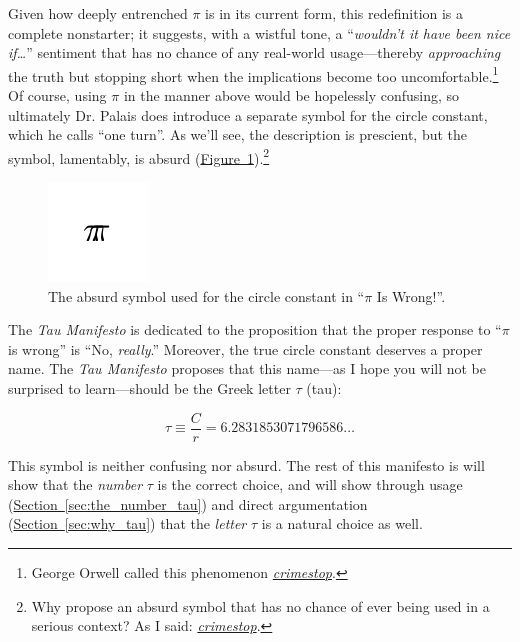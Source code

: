 \documentclass{article}
\begin{document}
\noindent Given how deeply entrenched $\pi$ is in its current form, this redefinition is a complete nonstarter; it suggests, with a wistful tone, a ``\emph{wouldn't it have been nice if\ldots}'' sentiment that has no chance of any real-world usage---thereby \emph{approaching} the truth but stopping short when the implications become too uncomfortable.\footnote{George Orwell called this phenomenon \href{http://en.wikipedia.org/wiki/Crimestop}{\emph{crimestop}}.} Of course, using $\pi$ in the manner above would be hopelessly confusing, so ultimately Dr. Palais does introduce a separate symbol for the circle constant, which he calls ``one turn''.  As we'll see, the description is prescient, but the symbol, lamentably, is absurd (\hyperref[fig:palais-tau]{Figure~}\ref{fig:palais-tau}).\footnote{Why propose an absurd symbol that has no chance of ever being used in a serious context? As I said: \href{http://en.wikipedia.org/wiki/Crimestop}{\emph{crimestop}}.}


\begin{figure}
\begin{center}
\includegraphics{images/figures/palais-tau.png}
\end{center}
\caption{The absurd symbol used for the circle constant in ``$\pi$ Is Wrong!''.\label{fig:palais-tau}}
\end{figure}

The \emph{Tau Manifesto} is dedicated to the proposition that the proper response to ``$\pi$ is wrong'' is ``No, \emph{really}.'' Moreover, the true circle constant deserves a proper name. The \emph{Tau Manifesto} proposes that this name---as I hope you will not be surprised to learn---should be the Greek letter $\tau$ (tau):

\[
  \tau \equiv \frac{C}{r} = 6.2831853071796586\ldots
\]

\noindent This symbol is neither confusing nor absurd. The rest of this manifesto is will show that the \emph{number} $\tau$ is the correct choice, and will show through usage (\hyperref[sec:the_number_tau]{Section~}\ref{sec:the_number_tau}) and direct argumentation (\hyperref[sec:why_tau]{Section~}\ref{sec:why_tau}) that the \emph{letter} $\tau$ is a natural choice as well.
\end{document}
